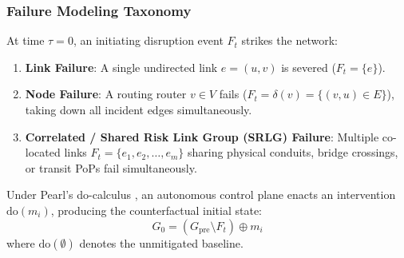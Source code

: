 \documentclass[pdflatex,sn-mathphys-num]{sn-jnl}
\theoremstyle{thmstyleone}
\theoremstyle{thmstyletwo}
\theoremstyle{thmstylethree}
\begin{document}
\subsubsection{Failure Modeling Taxonomy}
At time $\tau=0$, an initiating disruption event $F_t$ strikes the network:
\begin{enumerate}
    \item \textbf{Link Failure}: A single undirected link $e = (u, v)$ is severed ($F_t = \{e\}$).
    \item \textbf{Node Failure}: A routing router $v \in V$ fails ($F_t = \delta(v) = \{(v, u) \in E\}$), taking down all incident edges simultaneously.
    \item \textbf{Correlated / Shared Risk Link Group (SRLG) Failure}: Multiple co-located links $F_t = \{e_1, e_2, \dots, e_m\}$ sharing physical conduits, bridge crossings, or transit PoPs fail simultaneously.
\end{enumerate}

Under Pearl's do-calculus \cite{pearl2009causality}, an autonomous control plane enacts an intervention $\mathrm{do}(m_i)$, producing the counterfactual initial state:
\begin{equation}
G_0 = (G_{\mathrm{pre}} \setminus F_t) \oplus m_i
\end{equation}
where $\mathrm{do}(\emptyset)$ denotes the unmitigated baseline.
\end{document}
